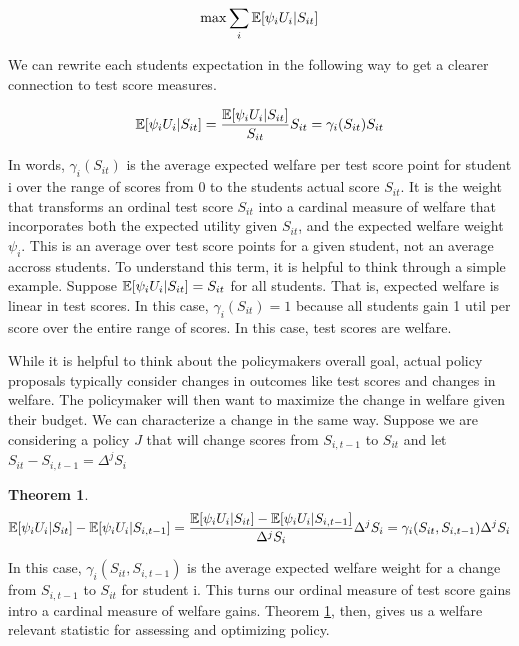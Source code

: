 \documentclass[12pt]{article}
\theoremstyle{definition}
\theoremstyle{definition}
\theoremstyle{definition}
\theoremstyle{definition}
\newtheorem{thm}{Theorem}
\begin{document}
     \begin{equation}
     \max \sum_i \mathbb{E}[ \psi_i U_{i} |S_{it}]
    \end{equation}
    
    We can rewrite each students expectation in the following way to get a clearer connection to test score measures. 
    
    \begin{equation}
         \mathbb{E}[ \psi_i U_{i} |S_{it}] = \frac{\mathbb{E}[ \psi_i U_{i} |S_{it}]}{S_{it}} S_{it} = \gamma_i(S_{it}) S_{it}
    \end{equation}

    
    In words, $\gamma_i(S_{it})$  is the average expected welfare per test score point for student i over the range of scores from 0 to the students actual score $S_{it}$. It is the weight that transforms an ordinal test score $S_{it}$ into a cardinal measure of welfare that incorporates both the expected utility given $S_{it}$, and the expected welfare weight $\psi_i$. This is an average over test score points for a given student, not an average accross students. To understand this term, it is helpful to think through a simple example. Suppose  $ \mathbb{E}[ \psi_i U_{i} |S_{it}]= S_{it}$ for all students. That is, expected welfare is linear in test scores. In this case,  $\gamma_i(S_{it}) = 1$ because all students gain 1 util per score over the entire range of scores. In this case, test scores are welfare. 

   While it is helpful to think about the policymakers overall goal, actual policy proposals typically consider changes in outcomes like test scores and changes in welfare. The policymaker will then want to maximize the change in welfare given their budget. We can characterize a change in the same way. Suppose we are considering a policy $J$ that will change scores from $S_{i,t-1}$ to $S_{it}$ and let $S_{it} - S_{i,t-1} = \Delta^jS_i$

    \begin{thm}
    \label{def_welfare_change}
         \begin{equation}
        \mathbb{E}[\psi_i U_i|S_{it}] - \mathbb{E}[\psi_i U_i |S_{i,t-1}] =  \frac{\mathbb{E}[\psi_i U_i|S_{it}] - \mathbb{E}[\psi_i U_i |S_{i,t-1}] }{\Delta^jS_i} \Delta^jS_i = \gamma_i(S_{it}, S_{i,t-1}) \Delta^jS_i
         \end{equation}
    \end{thm}
   
 
    In this case, $\gamma_i(S_{it}, S_{i,t-1})$ is the average expected welfare weight for a change from $S_{i,t-1}$ to $S_{it}$ for student i. This turns our ordinal measure of test score gains intro a cardinal measure of welfare gains. Theorem \ref{def_welfare_change}, then, gives us a welfare relevant statistic for assessing and optimizing policy.
 
\end{document}
